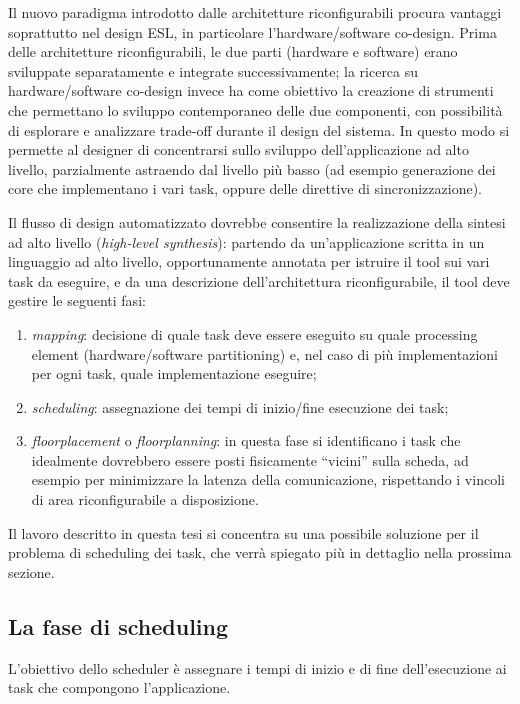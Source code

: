 Il nuovo paradigma introdotto dalle architetture riconfigurabili procura vantaggi
soprattutto nel design \ac{ESL}, in particolare l'\mbox{hardware/software} co-design.
Prima delle architetture riconfigurabili, le due parti (hardware e software) erano
sviluppate separatamente e integrate successivamente; la ricerca su 
\mbox{hardware/software} co-design invece ha come obiettivo la creazione di strumenti che 
permettano lo sviluppo contemporaneo delle due componenti, con possibilità di esplorare e 
analizzare trade-off durante il design del sistema. In questo modo si permette al 
designer di concentrarsi sullo sviluppo dell'applicazione ad alto livello, parzialmente 
astraendo dal livello più basso (ad esempio generazione dei core che implementano i vari 
task, oppure delle direttive di sincronizzazione).

Il flusso di design automatizzato dovrebbe consentire la realizzazione della sintesi ad 
alto livello (\emph{high-level synthesis}): partendo da un'applicazione scritta in un
linguaggio ad alto livello, opportunamente annotata per istruire il tool sui vari task
da eseguire, e da una descrizione dell'architettura riconfigurabile, il tool deve gestire
le seguenti fasi:
\begin{enumerate}
 \item \emph{mapping}: decisione di quale task deve essere eseguito su quale processing 
element (\mbox{hardware/software} partitioning) e, nel caso di più implementazioni per 
ogni task, quale implementazione eseguire;
 \item \emph{scheduling}: assegnazione dei tempi di inizio/fine esecuzione dei task;
 \item \emph{floorplacement} o \emph{floorplanning}: in questa fase si identificano i 
task che idealmente dovrebbero essere posti fisicamente ``vicini'' sulla scheda, ad 
esempio per minimizzare la latenza della comunicazione, rispettando i vincoli di area 
riconfigurabile a disposizione.
\end{enumerate}

Il lavoro descritto in questa tesi si concentra su una possibile soluzione per il 
problema di scheduling dei task, che verrà spiegato più in dettaglio nella prossima 
sezione.


\subsection{La fase di scheduling}
L'obiettivo dello scheduler è assegnare i tempi di inizio e di fine dell'esecuzione ai
task che compongono l'applicazione.

